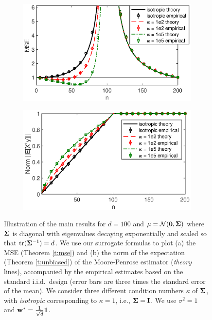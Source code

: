 \documentclass[thesis.tex]{subfiles}
\begin{document}
\begin{figure}[t]
  \centering
  \begin{subfigure}{0.49\textwidth}%
    \includegraphics[width=\textwidth]{../figs/descent-intro}
  \end{subfigure}
  \hfill
  \begin{subfigure}{0.49\textwidth}
    \includegraphics[width=\textwidth]{../figs/descent-shrinkage}
  \end{subfigure}
  \caption{Illustration of the main results for $d=100$ and
    $\mu=\mathcal{N}(\mathbf 0,\mathbf{\Sigma})$ where $\mathbf{\Sigma}$ is diagonal with
    eigenvalues decaying exponentially and scaled so that
    $\mathrm{tr}(\mathbf{\Sigma}^{-1})=d$. We use our surrogate
    formulas to plot (a) the MSE (Theorem \ref{t:mse}) and (b) the norm of the expectation (Theorem
    \ref{t:unbiased}) of the Moore-Penrose estimator (\emph{theory}
    lines), accompanied by the empirical estimates based on the standard
    i.i.d.~design (error bars are three times the standard error of the
    mean). We consider three different condition numbers $\kappa$ of
    $\mathbf{\Sigma}$, with \emph{isotropic} corresponding to $\kappa=1$,
    i.e., $\mathbf{\Sigma}=\mathbf I$. We use $\sigma^2=1$ and
    $\mathbf w^*=\frac1{\sqrt{d}}\mathbf 1$.}
  \label{f:intro}
\end{figure}
\end{document}
